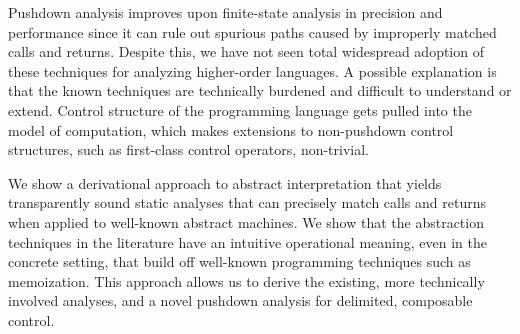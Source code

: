 Pushdown analysis improves upon finite-state analysis in precision and performance since it can rule out spurious paths caused by improperly matched calls and returns.
%
Despite this, we have not seen total widespread adoption of these techniques for analyzing higher-order languages.
%
A possible explanation is that the known techniques are technically burdened and difficult to understand or extend.
%
Control structure of the programming language gets pulled into the model of computation, which makes extensions to non-pushdown control structures, such as first-class control operators, non-trivial.

We show a derivational approach to abstract interpretation that yields transparently sound static analyses that can precisely match calls and returns when applied to well-known abstract machines.
%
We show that the abstraction techniques in the literature have an intuitive operational meaning, even in the concrete setting, that build off well-known programming techniques such as memoization.
%
This approach allows us to derive the existing, more technically involved analyses, and a novel pushdown analysis for delimited, composable control.
